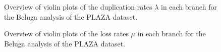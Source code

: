 \begin{figure}
    \noindent{}
	\caption[PLAZA Beluga duplication rates]{Overview of violin plots of the duplication rates $\lambda$ in each branch for the Beluga analysis of the PLAZA dataset.}
    \label{fig:plaza-lambda}
\end{figure}

\begin{figure}
    \noindent{}
	\caption[PLAZA Beluga loss rates]{Overview of violin plots of the loss rates $\mu$ in each branch for the Beluga analysis of the PLAZA dataset.}
    \label{fig:plaza-mu}
\end{figure}

